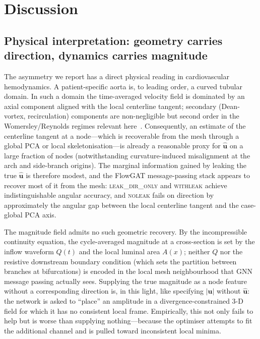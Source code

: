 \documentclass[10pt,a4paper]{article}
\newcommand{\withleak}{\textsc{withleak}}
\newcommand{\dironly}{\textsc{leak\_dir\_only}}
\newcommand{\noleak}{\textsc{noleak}}
\newcommand{\unit}[1]{\hat{\mathbf{#1}}}
\begin{document}
\section*{Discussion}

\subsection*{Physical interpretation: geometry carries direction, dynamics carries magnitude}

The asymmetry we report has a direct physical reading in
cardiovascular hemodynamics. A patient-specific aorta is, to leading
order, a curved tubular domain. In such a domain the time-averaged
velocity field is dominated by an axial component aligned with the
local centerline tangent; secondary (Dean-vortex, recirculation)
components are non-negligible but second order in the
Womersley/Reynolds regimes relevant
here~\cite{ku1997bloodflow,steinman2002}. Consequently, an estimate of
the centerline tangent at a node---which is recoverable from the mesh
through a global PCA or local skeletonisation---is already a
reasonable proxy for $\unit{u}$ on a large fraction of nodes
(notwithstanding curvature-induced misalignment at the arch and
side-branch origins). The marginal information gained by leaking the
true $\unit{u}$ is therefore modest, and the FlowGAT message-passing
stack appears to recover most of it from the mesh: \dironly{} and
\withleak{} achieve indistinguishable angular accuracy, and \noleak{}
fails on direction by approximately the angular gap between the local
centerline tangent and the case-global PCA axis.

The magnitude field admits no such geometric recovery. By the
incompressible continuity equation, the cycle-averaged magnitude at a
cross-section is set by the inflow waveform $Q(t)$ and the local
luminal area $A(x)$; neither $Q$ nor the resistive downstream
boundary condition (which sets the partition between branches at
bifurcations) is encoded in the local mesh neighbourhood that GNN
message passing actually sees. Supplying the true magnitude as a node
feature without a corresponding direction is, in this light, like
specifying $|\mathbf{u}|$ without $\unit{u}$: the network is asked to
``place'' an amplitude in a divergence-constrained 3-D field for which
it has no consistent local frame. Empirically, this not only fails to
help but is worse than supplying nothing---because the optimiser
attempts to fit the additional channel and is pulled toward
inconsistent local minima.
\end{document}
